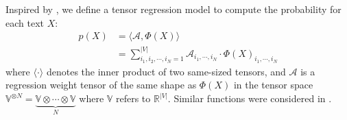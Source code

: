 Inspired by \cite{zhang2019generalized, kossaifi2020tensor}, we define a tensor regression model to compute the probability for each text $X$:
%
\begin{align} 
    \label{eq: general definition}
    p(X)
    &= \langle\mathcal{A}, \Phi(X)\rangle \nonumber \\
    &= \sum_{i_1,i_2,\cdots,i_N = 1}^{|V|} \mathcal{A}_{i_1,\cdots, i_N} \cdot \Phi(X)_{i_1,\cdots, i_N}
\end{align}
%
where $\langle \cdot \rangle$ denotes the inner product of two same-sized tensors, and  $\mathcal{A}$ is a regression weight tensor of the same shape as $\Phi(X)$ in the tensor space $\mathbb{V}^{\otimes N} = \underbrace{\mathbb{V} \otimes \cdots \otimes \mathbb{V}}_N $ where $\mathbb{V}$ refers to $\mathbb{R}^{|V|}$. Similar functions were considered in \cite{novikov2016exponential, NIPS2016_6211, khrulkov2018expressive, zhang2019generalized}.


